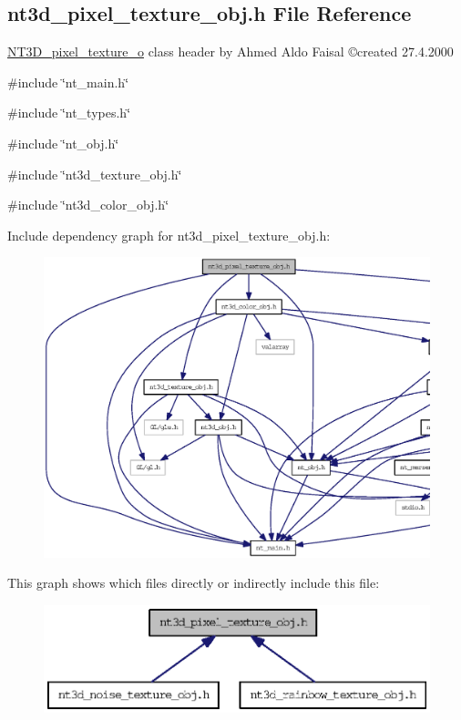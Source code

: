 \subsection{nt3d\_\-pixel\_\-texture\_\-obj.h File Reference}
\label{nt3d__pixel__texture__obj_8h}



\begin{DoxyItemize}
\item \hyperlink{class_n_t3_d__pixel__texture__o}{NT3D\_\-pixel\_\-texture\_\-o} class header by Ahmed Aldo Faisal \copyright created 27.4.2000 
\end{DoxyItemize} 


{\ttfamily \#include \char`\"{}nt\_\-main.h\char`\"{}}\par
{\ttfamily \#include \char`\"{}nt\_\-types.h\char`\"{}}\par
{\ttfamily \#include \char`\"{}nt\_\-obj.h\char`\"{}}\par
{\ttfamily \#include \char`\"{}nt3d\_\-texture\_\-obj.h\char`\"{}}\par
{\ttfamily \#include \char`\"{}nt3d\_\-color\_\-obj.h\char`\"{}}\par
Include dependency graph for nt3d\_\-pixel\_\-texture\_\-obj.h:
\nopagebreak
\begin{figure}[H]
\begin{center}
\leavevmode
\includegraphics[width=400pt]{nt3d__pixel__texture__obj_8h__incl}
\end{center}
\end{figure}
This graph shows which files directly or indirectly include this file:
\nopagebreak
\begin{figure}[H]
\begin{center}
\leavevmode
\includegraphics[width=346pt]{nt3d__pixel__texture__obj_8h__dep__incl}
\end{center}
\end{figure}
